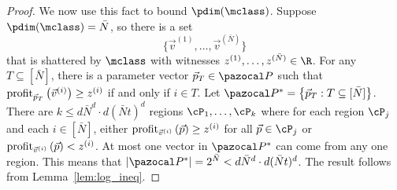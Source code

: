 \begin{proof}
We now use this fact to bound $\pdim(\mclass)$. Suppose $\pdim(\mclass) = \bar{N}$, so there is a set \[\{\vec{v}^{(1)}, \dots, \vec{v}^{(\bar{N})}\}\] that is shattered by $\mclass$ with witnesses $z^{(1)}, \dots, z^{(\bar{N})} \in \R$. For any $T \subseteq [\bar{N}]$, there is a parameter vector $\vec{p}_T \in \pspace$ such that $\textnormal{profit}_{\vec{p}_T}\left(\vec{v}^{(i)}\right) \geq z^{(i)}$ if and only if $i\in T$. Let $\pspace^* = \left\{\vec{p}_T : T \subseteq [\bar{N}]\right\}$. There are $k \leq d\bar{N}^d\cdot d(\bar{N}t)^d$ regions $\cP_1, \dots, \cP_k$ where for each region $\cP_j$ and each $i \in [\bar{N}]$, either $\textnormal{profit}_{\vec{v}^{(i)}}\left(\vec{p}\right)\geq z^{(i)}$ for all $\vec{p} \in \cP_j$ or $\textnormal{profit}_{\vec{v}^{(i)}}\left(\vec{p}\right) < z^{(i)}$.
At most one
vector in $\pspace^*$ can come from any one region. This means that $|\pspace^*| = 2^{\bar{N}} < d\bar{N}^d\cdot d(\bar{N}t)^d$. The result follows from Lemma~\ref{lem:log_ineq}.
\end{proof} 
